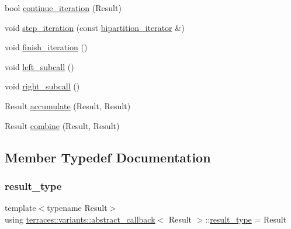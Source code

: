 \begin{DoxyCompactItemize}
\item 
bool \hyperlink{classterraces_1_1variants_1_1abstract__callback_ac90e8de571a8ad0d135f1b6fd14c3103}{continue\+\_\+iteration} (Result)
\item 
void \hyperlink{classterraces_1_1variants_1_1abstract__callback_a902bd7698240f1e96c58d14e53066661}{step\+\_\+iteration} (const \hyperlink{classterraces_1_1bipartition__iterator}{bipartition\+\_\+iterator} \&)
\item 
void \hyperlink{classterraces_1_1variants_1_1abstract__callback_a620ab0e89816f96ed30f68bb04110c20}{finish\+\_\+iteration} ()
\item 
void \hyperlink{classterraces_1_1variants_1_1abstract__callback_a2f05ded7e1d02c569777ca6b47467c34}{left\+\_\+subcall} ()
\item 
void \hyperlink{classterraces_1_1variants_1_1abstract__callback_a9a44428885ec76e5076f76d5518019d7}{right\+\_\+subcall} ()
\item 
Result \hyperlink{classterraces_1_1variants_1_1abstract__callback_a3023a9a366af9fd5fdd5d6ad26137dc7}{accumulate} (Result, Result)
\item 
Result \hyperlink{classterraces_1_1variants_1_1abstract__callback_a5978e41947d47b33f643d356750d07d8}{combine} (Result, Result)
\end{DoxyCompactItemize}


\subsection{Member Typedef Documentation}
\mbox{\label{classterraces_1_1variants_1_1abstract__callback_ac1da94f0be306068e89627dc40cd0f3b}} 
\subsubsection{\texorpdfstring{result\+\_\+type}{result\_type}}
{\footnotesize\ttfamily template$<$typename Result$>$ \\
using \hyperlink{classterraces_1_1variants_1_1abstract__callback}{terraces\+::variants\+::abstract\+\_\+callback}$<$ Result $>$\+::\hyperlink{classterraces_1_1variants_1_1abstract__callback_ac1da94f0be306068e89627dc40cd0f3b}{result\+\_\+type} =  Result}



